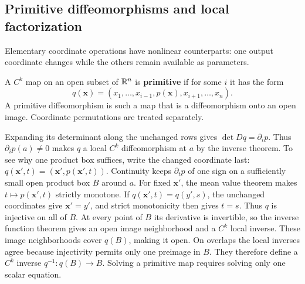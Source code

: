 \subsection{Primitive diffeomorphisms and local factorization}
Elementary coordinate operations have nonlinear counterparts: one output
coordinate changes while the others remain available as parameters.
\begin{definition}\label{def:primitive-map}
A $C^k$ map on an open subset of $\mathbb{R}^n$ is \textbf{primitive} if for
some $i$ it has the form
\[
q(\mathbf{x})=(x_1,\ldots,x_{i-1},p(\mathbf{x}),x_{i+1},\ldots,x_n).
\]
A primitive diffeomorphism is such a map that is a diffeomorphism onto
an open image. Coordinate permutations are treated separately.
\end{definition}
Expanding its determinant along the unchanged rows gives
$\det Dq=\partial_i p$. Thus $\partial_i p(a)\ne0$ makes $q$ a local
$C^k$ diffeomorphism at $a$ by the inverse theorem. To see why one
product box suffices, write the changed coordinate last:
$q(\mathbf{x}',t)=(\mathbf{x}',p(\mathbf{x}',t))$. Continuity keeps $\partial_t p$ of one sign
on a sufficiently small open product box $B$ around $a$. For fixed $\mathbf{x}'$,
the mean value theorem makes $t\mapsto p(\mathbf{x}',t)$ strictly monotone.
If $q(\mathbf{x}',t)=q(y',s)$, the unchanged coordinates give $\mathbf{x}'=y'$, and
strict monotonicity then gives $t=s$. Thus $q$ is injective on all of $B$.
At every point of $B$ its derivative is invertible, so the inverse
function theorem gives an open image neighborhood and a $C^k$ local
inverse. These image neighborhoods cover $q(B)$, making it open.
On overlaps the local inverses agree because injectivity permits only
one preimage in $B$. They therefore define a $C^k$ inverse
$q^{-1}:q(B)\to B$. Solving a primitive map requires solving only one
scalar equation.

